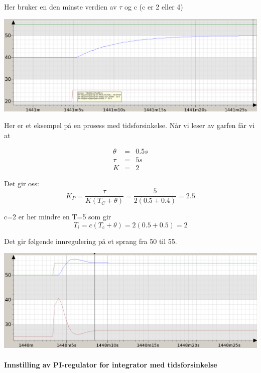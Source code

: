 Her bruker en den minste verdien av $\tau$ og c (c er 2 eller 4)

\includegraphics[width=1\textwidth]{Reg_step_response01}

Her er et eksempel på en prosess med tidsforsinkelse. Når vi leser
av garfen får vi at

\begin{eqnarray*}
\theta & = & 0.5s\\
\tau & = & 5s\\
K & = & 2
\end{eqnarray*}

Det gir oss:
\[
K_{P}=\dfrac{\tau}{K\left(T_{C}+\theta\right)}=\dfrac{5}{2(0.5+0.4)}=2.5
\]

c=2 er her mindre en T=5 som gir 
\[
T_{i}=c(T_{c}+\theta)=2(0.5+0.5)=2
\]

Det gir følgende innregulering på et sprang fra 50 til 55. 

\includegraphics[width=1\textwidth]{Reg_innreg_skogestad01}

\paragraph{Innstilling av PI-regulator for integrator med tidsforsinkelse}

~

